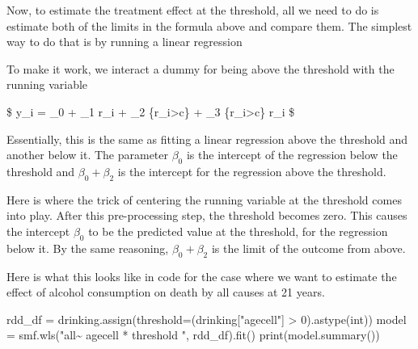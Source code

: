 \documentclass[
  letterpaper,
  DIV=11,
  numbers=noendperiod]{scrreprt}
\newenvironment{Shaded}{\begin{snugshade}}{\end{snugshade}}
\newcommand{\BuiltInTok}[1]{\textcolor[rgb]{0.00,0.23,0.31}{#1}}
\newcommand{\DecValTok}[1]{\textcolor[rgb]{0.68,0.00,0.00}{#1}}
\newcommand{\NormalTok}[1]{\textcolor[rgb]{0.00,0.23,0.31}{#1}}
\newcommand{\OperatorTok}[1]{\textcolor[rgb]{0.37,0.37,0.37}{#1}}
\newcommand{\StringTok}[1]{\textcolor[rgb]{0.13,0.47,0.30}{#1}}
\begin{document}
Now, to estimate the treatment effect at the threshold, all we need to
do is estimate both of the limits in the formula above and compare them.
The simplest way to do that is by running a linear regression

To make it work, we interact a dummy for being above the threshold with
the running variable

\$ y\_i = \beta\_0 + \beta\_1 r\_i + \beta\_2
\{r\_i\textgreater c\} + \beta\_3
\{r\_i\textgreater c\} r\_i \$

Essentially, this is the same as fitting a linear regression above the
threshold and another below it. The parameter \(\beta_0\) is the
intercept of the regression below the threshold and \(\beta_0+\beta_2\)
is the intercept for the regression above the threshold.

Here is where the trick of centering the running variable at the
threshold comes into play. After this pre-processing step, the threshold
becomes zero. This causes the intercept \(\beta_0\) to be the predicted
value at the threshold, for the regression below it. By the same
reasoning, \(\beta_0+\beta_2\) is the limit of the outcome from above.

Here is what this looks like in code for the case where we want to
estimate the effect of alcohol consumption on death by all causes at 21
years.

\begin{Shaded}
\begin{Highlighting}[]
\NormalTok{rdd\_df }\OperatorTok{=}\NormalTok{ drinking.assign(threshold}\OperatorTok{=}\NormalTok{(drinking[}\StringTok{"agecell"}\NormalTok{] }\OperatorTok{\textgreater{}} \DecValTok{0}\NormalTok{).astype(}\BuiltInTok{int}\NormalTok{))}
\NormalTok{model }\OperatorTok{=}\NormalTok{ smf.wls(}\StringTok{"all\textasciitilde{} agecell * threshold "}\NormalTok{, rdd\_df).fit()}
\BuiltInTok{print}\NormalTok{(model.summary())}
\end{Highlighting}
\end{Shaded}
\end{document}
